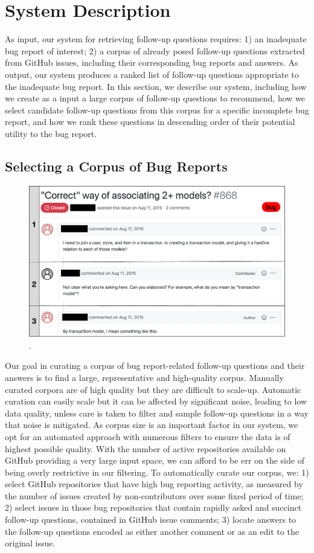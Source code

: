 \section{System Description}

As input, our system for retrieving follow-up questions requires: 1) an inadequate bug
report of interest; 2) a corpus of already posed follow-up questions extracted
from GitHub issues, including their corresponding bug reports and answers. As output, our system
produces a ranked list of follow-up questions appropriate to the inadequate bug report.
In this section, we describe our system, including how we create as a input
a large corpus of follow-up questions to recommend, how we select candidate follow-up questions from
this corpus for a specific incomplete bug report, and how we rank these questions in descending order of
their potential utility to the bug report.

\subsection{Selecting a Corpus of Bug Reports}


\begin{figure}[ht]
\centering
\includegraphics[width=0.70\linewidth]{figures/sample_issue.pdf}
\caption{.}
\label{fig:sample_br}
\end{figure}

Our goal in curating a corpus of bug report-related follow-up questions and their answers
is to find a large, representative and high-quality corpus. Manually curated corpora are of
high quality but they are difficult to scale-up. Automatic curation can easily scale but it
can be affected by significant noise, leading to low data quality, unless care is taken
to filter and sample follow-up questions in a way that noise is mitigated. As corpus size
is an important factor in our system, we opt for an automated approach with numerous filters
to ensure the data is of highest possible quality. With the number of active repositories available
on GitHub providing a very large input space, we can afford to be err on the side of being overly
restrictive in our filtering.
To automatically curate our corpus, we: 1) select GitHub repositories that have high bug reporting activity,
as measured by the number of issues created by non-contributors over some fixed period of time; 2) select issues in those bug repositories that contain rapidly asked and succinct follow-up questions, contained in GitHub issue comments; 3) locate
answers to the follow-up questions encoded as either another comment or as an edit to the
original issue.

